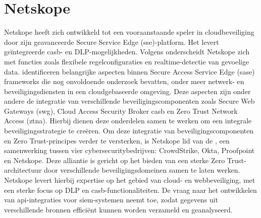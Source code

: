 
\section{Netskope}%
\label{sec:netskope-literatuurstudie}

Netskope heeft zich ontwikkeld tot een vooraanstaande speler in cloudbeveiliging door zijn geavanceerde Secure Service Edge (\gls{sse})-platform. 
Het levert geïntegreerde \gls{casb}- en DLP-mogelijk\-heden. 
Volgens \textcite{Riley2018} onderscheidt Netskope zich met functies zoals flexibele regelconfiguraties en realtime-detectie van gevoelige data. 
\textcite{VanDerWalt2022} identificeren belangrijke aspecten binnen Secure Access Service Edge (\gls{sase}) frameworks die nog onvoldoende onderzoek bevatten,
onder meer netwerk- en beveiligingsdiensten in een cloudgebaseerde omgeving. 
Deze aspecten zijn onder andere de integratie van verschillende beveiligingscomponenten zoals Secure Web Gateways (\gls{swg}), Cloud Access Security Broker \gls{casb} en Zero Trust Network Access (\gls{ztna}). 
Hierbij dienen deze onderdelen samen te werken om een integrale beveiligingsstrategie te creëren. 
Om deze integratie van beveiligingscomponenten en Zero Trust-principes verder te versterken, 
is Netskope lid van de \textcite{SpectraAlliance2025}, een samenwerking tussen vier cybersecuritybedrijven: CrowdStrike, Okta, Proofpoint en Netskope.
Deze alliantie is gericht op het bieden van een sterke Zero Trust-architectuur door verschillende beveiligingsdomeinen samen te laten werken. 
Netskope levert hierbij expertise op het gebied van cloud- en webbeveiliging, met een sterke focus op DLP\- en \gls{casb}\--functionaliteiten.
De vraag naar het ontwikkelen van \gls{api}-integraties voor \gls{siem}-systemen neemt toe, zodat gegevens uit verschillende bronnen efficiënt kunnen worden verzameld en geanalyseerd.

